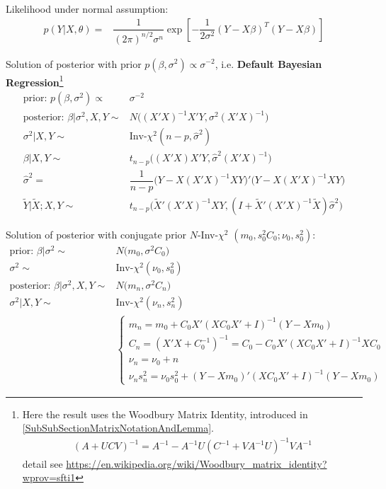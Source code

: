 Likelihood under normal assumption:
\begin{align}
    p(Y|X,\theta )=&\dfrac{ 1 }{ (2\pi )^{n/2}\sigma ^{n} }\exp\left[ -\dfrac{ 1 }{ 2\sigma ^2 }(Y-X\beta )^T(Y-X\beta ) \right]
\end{align}

Solution of posterior with prior $ p(\beta ,\sigma ^2)\propto \sigma ^{-2} $, i.e. \textbf{Default Bayesian Regression}\footnote{Here the result uses the Woodbury Matrix Identity, introduced in \autoref{SubSubSectionMatrixNotationAndLemma}.
\begin{align}
    (A+UCV)^{-1}=A^{-1}-A^{-1}U(C^{-1}+VA^{-1}U)^{-1}VA^{-1} 
\end{align}
detail see \url{https://en.wikipedia.org/wiki/Woodbury_matrix_identity?wprov=sfti1}
}
\begin{align}
     \text{prior: }p(\beta ,\sigma ^2)\propto & \sigma ^{-2}\\
     \text{posterior: }\beta |\sigma ^2,X,Y\sim &N\big( (X'X)^{-1}X'Y, \sigma ^2(X'X)^{-1}\big)\\
    \sigma ^2|X,Y\sim & \mathrm{Inv}\text{-}\chi^2(n-p, \hat{\sigma }^2)\\
    \beta |X,Y\sim & t_{n-p}\big( (X'X)X'Y, \hat{\sigma }^2(X'X)^{-1} \big)\\
    \hat{\sigma }^2=&\dfrac{ 1 }{ n-p }\big(Y-X(X'X)^{-1}XY\big) '\big(Y-X(X'X)^{-1}XY\big) \\
    \tilde{Y}|\tilde{X};X,Y\sim & t_{n-p}\bigl( \tilde{X}'(X'X)^{-1}XY, (I+ \tilde{X}'(X'X)^{-1}\tilde{X}) \hat{\sigma }^2 \bigr)
\end{align}

Solution of posterior with conjugate prior $ N $-Inv-$ \chi^2 $ $ (m_0, s_0^2C_0; \nu _0,s_0^2) $:
\begin{align}
    \text{prior: }\beta |\sigma ^2\sim& N\big( m_0,\sigma ^2C_0 \big)\\
    \sigma ^2\sim & \mathrm{Inv}\text{-}\chi^2(\nu_0, s_0^2)\\
    \text{posterior: }\beta |\sigma ^2,X,Y\sim & N\big( m_n,\sigma ^2C_n \big)\\
    \sigma ^2|X,Y\sim & \mathrm{Inv}\text{-}\chi^2(\nu_n, s_n^2)\\
    &\begin{cases}
        m_n=m_0+ C_0X'(XC_0X'+I)^{-1}(Y-Xm_0)\\
        C_n=(X'X+C_0^{-1})^{-1}=C_0-C_0X'(XC_0X'+I)^{-1}XC_0\\
        \nu_n=\nu_0+n\\
        \nu_ns_n^2=\nu_0s_0^2+(Y-Xm_0)'(XC_0X'+I)^{-1}(Y-Xm_0)
    \end{cases}
\end{align}

